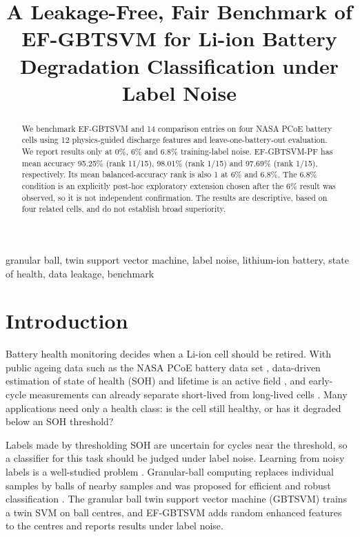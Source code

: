 \documentclass[conference,a4paper]{IEEEtran}
\begin{document}
\title{A Leakage-Free, Fair Benchmark of EF-GBTSVM for Li-ion Battery Degradation Classification under Label Noise}
\author{}
\maketitle
\begin{abstract}
We benchmark EF-GBTSVM and 14 comparison entries on four NASA PCoE battery cells using 12 physics-guided discharge features and leave-one-battery-out evaluation. We report results only at 0\%, 6\% and 6.8\% training-label noise. EF-GBTSVM-PF has mean accuracy 95.25\% (rank 11/15), 98.01\% (rank 1/15) and 97.69\% (rank 1/15), respectively. Its mean balanced-accuracy rank is also 1 at 6\% and 6.8\%. The 6.8\% condition is an explicitly post-hoc exploratory extension chosen after the 6\% result was observed, so it is not independent confirmation. The results are descriptive, based on four related cells, and do not establish broad superiority.
\end{abstract}
\begin{IEEEkeywords}
granular ball, twin support vector machine, label noise, lithium-ion battery, state of health, data leakage, benchmark
\end{IEEEkeywords}


\section{Introduction}

Battery health monitoring decides when a Li-ion cell should be retired. With public ageing data such as the NASA PCoE battery data set \cite{r10}, data-driven estimation of state of health (SOH) and lifetime is an active field \cite{r22}, and early-cycle measurements can already separate short-lived from long-lived cells \cite{r23}. Many applications need only a health class: is the cell still healthy, or has it degraded below an SOH threshold?

Labels made by thresholding SOH are uncertain for cycles near the threshold, so a classifier for this task should be judged under label noise. Learning from noisy labels is a well-studied problem \cite{r17}. Granular-ball computing replaces individual samples by balls of nearby samples and was proposed for efficient and robust classification \cite{r24}. The granular ball twin support vector machine (GBTSVM) \cite{r30} trains a twin SVM on ball centres, and EF-GBTSVM \cite{r29} adds random enhanced features to the centres and reports results under label noise.
\end{document}
